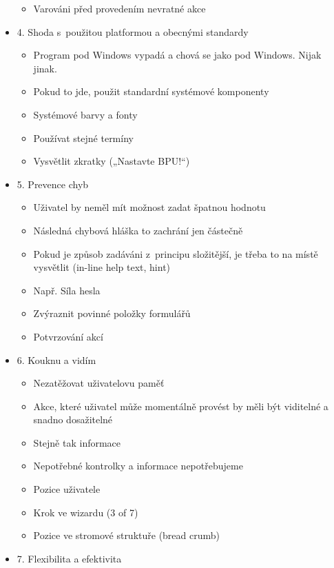 \begin{itemize}
\begin{itemize}
            \item Varováni před provedením nevratné akce
        \end{itemize}
    \item 4. Shoda s~použitou platformou a obecnými standardy
        \begin{itemize}
            \item Program pod Windows vypadá a chová se jako pod Windows. Nijak jinak.
            \item Pokud to jde, použit standardní systémové komponenty
            \item Systémové barvy a fonty
            \item Používat stejné termíny
            \item Vysvětlit zkratky („Nastavte BPU!“)
        \end{itemize}
    \item 5. Prevence chyb
        \begin{itemize}
            \item Uživatel by neměl mít možnost zadat špatnou hodnotu
            \item Následná chybová hláška to zachrání jen částečně
            \item Pokud je způsob zadáváni z~principu složitější, je třeba to na místě vysvětlit (in-line help text, hint)
            \item Např. Síla hesla
            \item Zvýraznit povinné položky formulářů
            \item Potvrzování akcí
        \end{itemize}
    \item 6. Kouknu a vidím
        \begin{itemize}
            \item Nezatěžovat uživatelovu paměť
            \item Akce, které uživatel může momentálně provést by měli být viditelné a snadno dosažitelné
            \item Stejně tak informace
            \item Nepotřebné kontrolky a informace nepotřebujeme
            \item Pozice uživatele
            \item Krok ve wizardu (3 of 7)
            \item Pozice ve stromové struktuře (bread crumb)
        \end{itemize}
    \item 7. Flexibilita a efektivita

\end{itemize}
